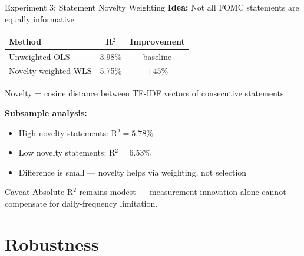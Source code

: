 \documentclass[aspectratio=169, 11pt]{beamer}
\begin{document}
\begin{frame}{Experiment 3: Statement Novelty Weighting}
  \textbf{Idea:} Not all FOMC statements are equally informative

  \vspace{0.3em}
  \centering
  \begin{tabular}{lcc}
    \toprule
    Method & R$^2$ & Improvement \\
    \midrule
    Unweighted OLS       & 3.98\% & baseline \\
    Novelty-weighted WLS & 5.75\% & +45\% \\
    \bottomrule
  \end{tabular}

  \vspace{0.3em}
  Novelty = cosine distance between TF-IDF vectors of consecutive statements

  \vspace{0.5em}
  \textbf{Subsample analysis:}
  \begin{itemize}
    \item High novelty statements: R$^2 = 5.78\%$
    \item Low novelty statements: R$^2 = 6.53\%$
    \item Difference is small --- novelty helps via weighting, not selection
  \end{itemize}

  \vspace{0.3em}
  \begin{alertblock}{Caveat}
    Absolute R$^2$ remains modest --- measurement innovation alone cannot compensate for daily-frequency limitation.
  \end{alertblock}
\end{frame}

\section{Robustness}
\end{document}
